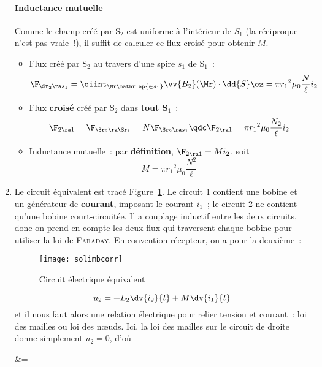 \documentclass[a4paper, 10pt, final, garamond]{book}
\begin{document}
\begin{enumerate}
	      \paragraph*{Inductance mutuelle}
	      Comme le champ créé par S$_2$ est uniforme à l'intérieur de $S_1$ (la
	      réciproque n'est pas vraie~!), il suffit de calculer ce flux croisé pour
	      obtenir $M$.
	      \begin{itemize}
		      \item Flux créé par S$_2$ au travers d'une spire $s_1$ de S$_1$~:
		            \[
			            \F_{\Sr_2 \ra s_1}
			            = \oiint_{\Mr \mathrlap{\in s_1}} \vv{B_2}(\Mr)\cdot \dd{S}\ez
			            = \pi r_1{}^{2} \mu_0 \frac{N}{\ell}i_2
		            \]
		      \item Flux \textbf{croisé} créé par S$_2$ dans \textbf{tout S$_1$}~:
		            \[
			            \F_{2\ra 1} = \F_{\Sr_2\ra\Sr_1} = N \F_{\Sr_2\ra s_1}
			            \qdc
			            \F_{2\ra 1} = \pi r_1{}^{2} \mu_0 \frac{N_2}{\ell}i_2
		            \]
		      \item Inductance mutuelle~: par \textbf{définition}, $\F_{2\ra 1} =
			            Mi_2$, soit
		            \[
			            \boxed{M = \pi r_1{}^{2} \mu_0 \frac{N^2}{\ell}}
		            \]
	      \end{itemize}
	\item Le circuit équivalent est tracé Figure~\ref{fig:solimbcorr}. Le circuit
	      1 contient une bobine et un générateur de \textbf{courant}, imposant le
	      courant $i_1$~; le circuit 2 ne contient qu'une bobine court-circuitée.
	      Il a couplage inductif entre les deux circuits, donc on prend en compte
	      les deux flux qui traversent chaque bobine pour utiliser la loi de
	      \textsc{Faraday}. En convention récepteur, on a pour la deuxième~:
	      \begin{figure}[htbp]
		      \centering
		      \texttt{[image: solimbcorr]}
		      \caption{Circuit électrique équivalent}
		      \label{fig:solimbcorr}
	      \end{figure}
	      \[
		      u_2 = +L_2 \dv{i_2}{t} + M \dv{i_1}{t}
	      \]
	      et il nous faut alors une relation électrique pour relier tension et
	      courant~: loi des mailles ou loi des nœuds. Ici, la loi des mailles sur
	      le circuit de droite donne simplement $u_2 = 0$, d'où
	      \begin{DispWithArrows*}
		       &= -  
		       \\

\end{DispWithArrows*}
\end{enumerate}
\end{document}
